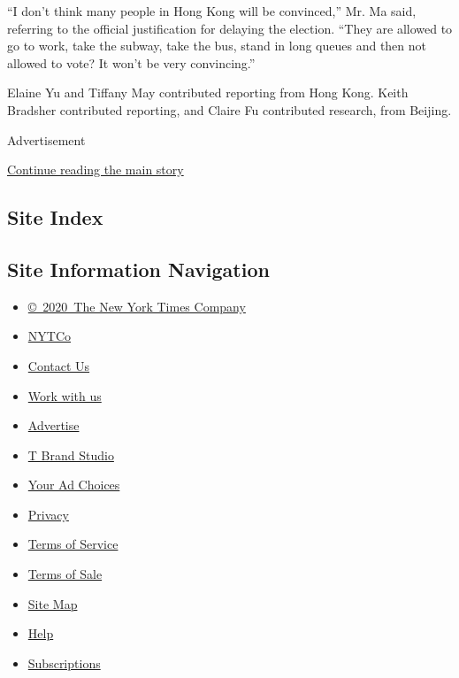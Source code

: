 ``I don't think many people in Hong Kong will be convinced,'' Mr. Ma
said, referring to the official justification for delaying the election.
``They are allowed to go to work, take the subway, take the bus, stand
in long queues and then not allowed to vote? It won't be very
convincing.''

Elaine Yu and Tiffany May contributed reporting from Hong Kong. Keith
Bradsher contributed reporting, and Claire Fu contributed research, from
Beijing.

Advertisement

\protect\hyperlink{after-bottom}{Continue reading the main story}

\hypertarget{site-index}{%
\subsection{Site Index}\label{site-index}}

\hypertarget{site-information-navigation}{%
\subsection{Site Information
Navigation}\label{site-information-navigation}}

\begin{itemize}
\tightlist
\item
  \href{https://help.nytimes.com/hc/en-us/articles/115014792127-Copyright-notice}{©~2020~The
  New York Times Company}
\end{itemize}

\begin{itemize}
\tightlist
\item
  \href{https://www.nytco.com/}{NYTCo}
\item
  \href{https://help.nytimes.com/hc/en-us/articles/115015385887-Contact-Us}{Contact
  Us}
\item
  \href{https://www.nytco.com/careers/}{Work with us}
\item
  \href{https://nytmediakit.com/}{Advertise}
\item
  \href{http://www.tbrandstudio.com/}{T Brand Studio}
\item
  \href{https://www.nytimes.com/privacy/cookie-policy\#how-do-i-manage-trackers}{Your
  Ad Choices}
\item
  \href{https://www.nytimes.com/privacy}{Privacy}
\item
  \href{https://help.nytimes.com/hc/en-us/articles/115014893428-Terms-of-service}{Terms
  of Service}
\item
  \href{https://help.nytimes.com/hc/en-us/articles/115014893968-Terms-of-sale}{Terms
  of Sale}
\item
  \href{https://spiderbites.nytimes.com}{Site Map}
\item
  \href{https://help.nytimes.com/hc/en-us}{Help}
\item
  \href{https://www.nytimes.com/subscription?campaignId=37WXW}{Subscriptions}
\end{itemize}
